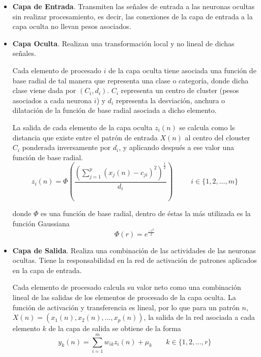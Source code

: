 \documentclass[letterpaper,11pt]{article}
\begin{document}
\begin{enumerate}
    \begin{itemize}
        \item \textbf{Capa de Entrada}. Transmiten las señales de entrada a las 
        neuronas ocultas sin realizar procesamiento, es decir, las conexiones de 
        la capa de entrada a la capa oculta no llevan pesos asociados. 

        \item \textbf{Capa Oculta}. Realizan una transformación local y no lineal 
        de dichas señales.

        Cada elemento de procesado $i$ de la capa oculta tiene asociada una 
        función de base radial de tal manera que representa una clase o 
        categoría, donde dicha clase viene dada por $(C_i, d_i)$. $C_i$
        representa un centro de cluster (pesos asociados a cada neurona $i$) y 
        $d_i$ representa la desviación, anchura o dilatación de la función de 
        base radial asociada a dicho elemento. 

        La salida de cada elemento de la capa oculta $z_i (n)$ se calcula como 
        ls distancia que existe entre el patrón de entrada $X (n)$ al centro del 
        clouster $C_i$ ponderada inversamente por $d_i$, y aplicando después a 
        ese valor una función de base radial.
        \begin{equation*}
            z_i (n) = 
            \Phi \left(\frac{\left( \sum^p_{j=1} \left( x_j (n) - c_{ji} 
                                                 \right)^2 \right)^{\frac{1}{2}}}
                            {d_i} \right) \; \; \; \; \; \; \; \; \; 
            i \in \{1, 2, ..., m\}
        \end{equation*}

        donde $\Phi$ es una función de base radial, dentro de éstas la más 
        utilizada es la función Gaussiana 
        \begin{equation*}
            \Phi (r) = e^{\frac{-r^2}{2}}
        \end{equation*}

        \item \textbf{Capa de Salida}. Realiza una combinación de las actividades 
        de las neuronas ocultas. Tiene la responsabilidad en la red de activación 
        de patrones aplicados en la capa de entrada. 

        Cada elemento de procesado calcula su valor neto como una combinación
        lineal de las salidas de los elementos de procesado de la capa oculta.
        La función de activación y transferencia es lineal, por lo que para un 
        patrón $n$, $X(n) = (x_1 (n), x_2 (n), ..., x_p (n))$, la salida de la 
        red asociada a cada elemento $k$ de la capa de salida se obtiene de la 
        forma 
        \begin{equation*}
            y_k (n) = \sum^m_{i=1} w_{ik} z_i (n) + \mu_k \; \; \; \; \; \; \;
            k \in \{1, 2, ..., r\}
        \end{equation*}


\end{itemize}
\end{enumerate}
\end{document}
